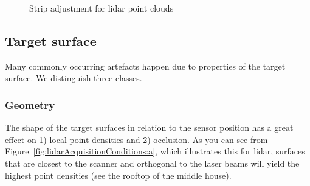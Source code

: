 \begin{figure}
\begin{subfigure}{0.4\linewidth}
		\label{fig:lidarGableRoof}
	\end{subfigure}
	\caption{Strip adjustment for lidar point clouds}
	\label{fig:lidarStripAdj}
\end{figure}

\subsection{Target surface}
Many commonly occurring  artefacts  happen due to properties of the target surface. We distinguish three classes.

\subsubsection{Geometry} 
The shape of the target surfaces in relation to the sensor position has a great effect on 1) local point densities and 2) occlusion. 
As you can see from Figure~\ref{fig:lidarAcquisitionConditions:a}, which illustrates this for lidar, surfaces that are closest to the scanner and orthogonal to the laser beams will yield the highest point densities (see the rooftop of the middle house). 
